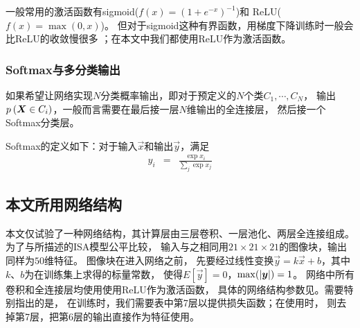 一般常用的激活函数有sigmoid($f(x) = (1+e^{-x})^{-1}$)和
ReLU($f(x) = \max(0, x)$)。
但对于sigmoid这种有界函数，用梯度下降训练时一般会比ReLU的收敛慢很多
\cite{krizhevsky2012imagenet}；在本文中我们都使用ReLU作为激活函数。


\subsubsection{Softmax与多分类输出}
如果希望让网络实现$N$分类概率输出，即对于预定义的$N$个类$C_1,\cdots,C_N$，
输出$p_{}\left(\boldsymbol{X}\in C_i\right)$，一般而言需要在最后接一层$N$维输出的全连接层，
然后接一个Softmax分类层。

Softmax的定义如下：对于输入$\vec{x}$和输出$\vec{y}$，满足
\begin{eqnarray}
    y_i &=& \frac{\exp{x_i}}{\sum_j{\exp{x_j}}}
\end{eqnarray}


\subsection{本文所用网络结构}
本文仅试验了一种网络结构，其计算层由三层卷积、一层池化、两层全连接组成。
为了与所描述的ISA模型公平比较，
输入与之相同用$21\times 21 \times 21$的图像块，输出同样为$50$维特征。
图像块在进入网络之前，
先要经过线性变换$\vec{y}=k\vec{x}+b$，其中$k$、$b$为在训练集上求得的标量常数，
使得$E[\vec{y}]=0$，$\max(\left|\boldsymbol{y}\right|)=1$。
网络中所有卷积和全连接层均使用使用ReLU作为激活函数，
具体的网络结构参数见。需要特别指出的是，
在训练时，我们需要表中第7层以提供损失函数；在使用时，
则去掉第7层，把第6层的输出直接作为特征使用。

